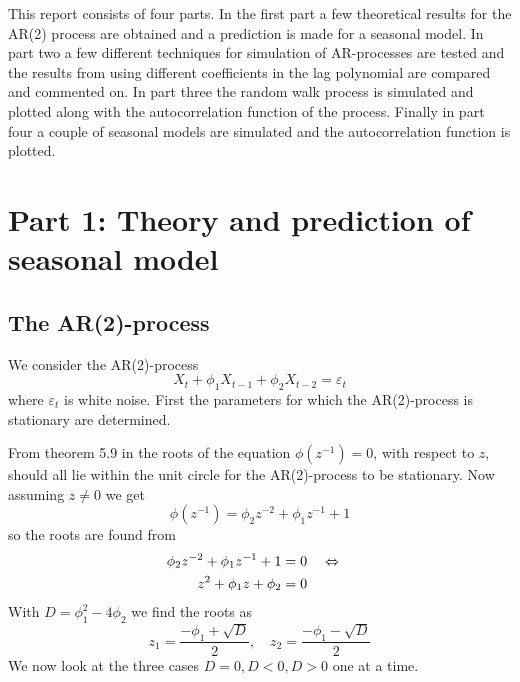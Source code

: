\def\assignmenttitle{Simulation of AR(p) and Seasonal processes}
\def\assignmentnumber{2}
\def\assignmentdate{11-10-2011}





\maketitle

This report consists of four parts. In the first part a few theoretical results for the AR(2) process are obtained and a prediction is made for a seasonal model. In part two a few different techniques for simulation of AR-processes are tested and the results from using different coefficients in the lag polynomial are compared and commented on. In part three the random walk process is simulated and plotted along with the autocorrelation function of the process. Finally in part four a couple of seasonal models are simulated and the autocorrelation function is plotted.

\section*{Part 1: Theory and prediction of seasonal model}
\subsection*{The AR(2)-process}
We consider the AR(2)-process
\begin{equation*}
    X_t + \phi_1 X_{t-1} + \phi_2 X_{t-2} = \varepsilon_t
\end{equation*}
where $\varepsilon_t$ is white noise. First the parameters for which the AR(2)-process is stationary are determined. \par

From theorem 5.9 in \cite{hm} the roots of the equation $\phi(z^{-1})=0$, with respect to $z$, should all lie within the unit circle for the AR(2)-process to be stationary. Now assuming $z\neq0$ we get
\begin{equation*}
    \phi(z^{-1}) = \phi_2 z^{-2} + \phi_1 z^{-1} + 1
\end{equation*}
so the roots are found from
\begin{align*}
    \phi_2 z^{-2} + \phi_1 z^{-1} + 1 &= 0 \quad\Leftrightarrow\quad \\
    z^2 + \phi_1 z + \phi_2 &= 0
\end{align*}
With $D = \phi_1^2 - 4\phi_2$ we find the roots as
\begin{equation*}
    z_1 = \frac{-\phi_1 + \sqrt{D}}{2},\quad z_2 = \frac{-\phi_1 - \sqrt{D}}{2}
\end{equation*}
We now look at the three cases $D=0, D<0, D>0$ one at a time. \par

